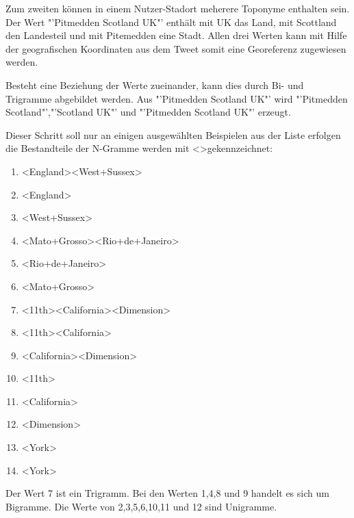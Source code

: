 				Zum zweiten können in einem Nutzer-Stadort meherere Toponyme enthalten sein.  
				Der Wert "'Pitmedden Scotland UK"' enthält mit UK das Land, mit Scottland den Landesteil und mit Pitemedden eine Stadt. 
				Allen drei Werten kann mit Hilfe der geografischen Koordinaten aus dem Tweet somit eine Georeferenz zugewiesen werden. 

				Besteht eine Beziehung der Werte zueinander, kann dies durch Bi- und Trigramme abgebildet werden.
				Aus "'Pitmedden Scotland UK"' wird "'Pitmedden Scotland"',"'Scotland UK"' und "'Pitmedden Scotland UK"' erzeugt.

				Dieser Schritt soll nur an einigen ausgewählten Beispielen aus der Liste erfolgen die Bestandteile der N-Gramme werden mit \textless \textgreater gekennzeichnet:

				\begin{multicols}{2}
					\begin{enumerate}
						\item \textless England\textgreater   \textless West+Sussex\textgreater  
						\item \textless England\textgreater  
						\item \textless West+Sussex\textgreater  
						\item \textless Mato+Grosso\textgreater   \textless Rio+de+Janeiro\textgreater  
						\item \textless Rio+de+Janeiro\textgreater  
						\item \textless Mato+Grosso\textgreater  
						\item \textless 11th\textgreater   \textless California\textgreater   \textless Dimension\textgreater   
						\item \textless 11th\textgreater   \textless California\textgreater  
						\item \textless California\textgreater   \textless Dimension\textgreater   
						\item \textless 11th\textgreater  
						\item \textless California\textgreater  
						\item \textless Dimension\textgreater   
						\item \textless York\textgreater  
						\item \textless York\textgreater  
					\end{enumerate}
				\end{multicols}
				 Der Wert 7 ist ein Trigramm.
				 Bei den Werten 1,4,8 und 9 handelt es sich um Bigramme. 
				 Die Werte von 2,3,5,6,10,11 und 12 sind Unigramme.

